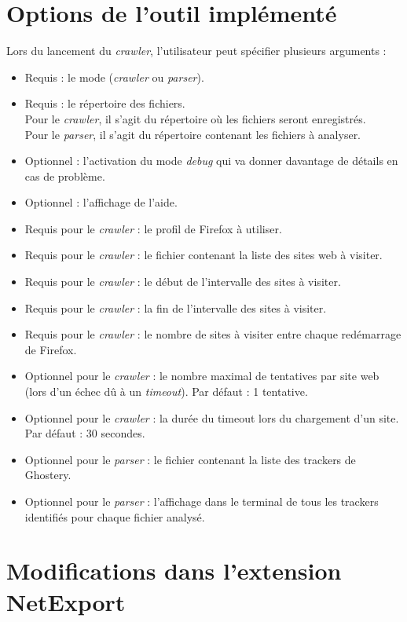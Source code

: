 \appendix
\chapter{Options de l'outil implémenté}
\label{options_outil_implémenté}
Lors du lancement du \textit{crawler}, l'utilisateur peut spécifier plusieurs arguments :
\begin{itemize}
	\item Requis : le mode (\textit{crawler} ou \textit{parser}).
	\item Requis : le répertoire des fichiers.\\
		Pour le \textit{crawler}, il s'agit du répertoire où les fichiers seront enregistrés.\\
		Pour le \textit{parser}, il s'agit du répertoire contenant les fichiers à analyser.
	\item Optionnel : l'activation du mode \textit{debug} qui va donner davantage de détails en cas de problème.
	\item Optionnel : l'affichage de l'aide.
	\newline
	\item Requis pour le \textit{crawler} : le profil de Firefox à utiliser.
	\item Requis pour le \textit{crawler} : le fichier contenant la liste des sites web à visiter.
	\item Requis pour le \textit{crawler} : le début de l'intervalle des sites à visiter.
	\item Requis pour le \textit{crawler} : la fin de l'intervalle des sites à visiter.
	\item Requis pour le \textit{crawler} : le nombre de sites à visiter entre chaque redémarrage de Firefox.
	\item Optionnel pour le \textit{crawler} : le nombre maximal de tentatives par site web (lors d'un échec dû à un \textit{timeout}). Par défaut : 1 tentative.
	\item Optionnel pour le \textit{crawler} : la durée du timeout lors du chargement d'un site. Par défaut : 30 secondes.
	\newline
	\item Optionnel pour le \textit{parser} : le fichier contenant la liste des trackers de Ghostery.
	\item Optionnel pour le \textit{parser} : l'affichage dans le terminal de tous les trackers identifiés pour chaque fichier analysé.
\end{itemize}

\chapter{Modifications dans l'extension NetExport}
